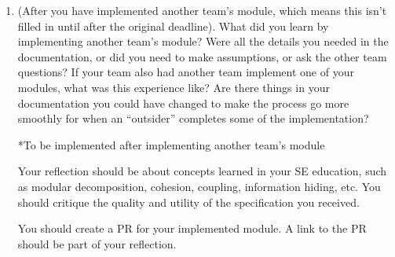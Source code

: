 \documentclass[12pt, titlepage]{article}
\begin{document}
\begin{enumerate}
  \item (After you have implemented another team's module, which means this
  isn't filled in until after the original deadline). What did you learn by
  implementing another team's module? Were all the details you needed in the
  documentation, or did you need to make assumptions, or ask the other team
  questions?  If your team also had another team implement one of your modules,
  what was this experience like?  Are there things in your documentation you
  could have changed to make the process go more smoothly for when an
  ``outsider'' completes some of the implementation?

  	*To be implemented after implementing another team’s module 

  Your reflection should be about concepts learned in your SE education, such as modular decomposition, cohesion, coupling, information hiding, etc.  You should critique the quality and utility of the specification you received.

  You should create a PR for your implemented module.  A link to the PR should be part of your reflection.

\end{enumerate}
\end{document}
